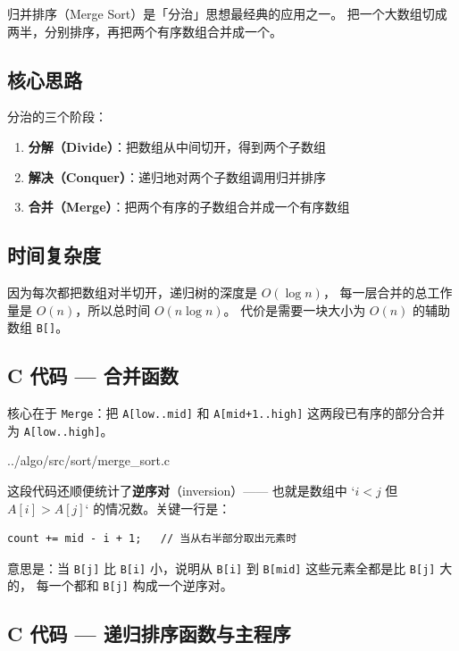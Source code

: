 归并排序（Merge Sort）是「分治」思想最经典的应用之一。
把一个大数组切成两半，分别排序，再把两个有序数组合并成一个。

\subsection{核心思路}

分治的三个阶段：

\begin{enumerate}
    \item \textbf{分解（Divide）}：把数组从中间切开，得到两个子数组
    \item \textbf{解决（Conquer）}：递归地对两个子数组调用归并排序
    \item \textbf{合并（Merge）}：把两个有序的子数组合并成一个有序数组
\end{enumerate}

\subsection{时间复杂度}

因为每次都把数组对半切开，递归树的深度是 \(O(\log n)\)，
每一层合并的总工作量是 \(O(n)\)，所以总时间 \(O(n \log n)\)。
代价是需要一块大小为 \(O(n)\) 的辅助数组 \texttt{B[]}。

\subsection{C 代码 — 合并函数}

核心在于 \texttt{Merge}：把 \texttt{A[low..mid]} 和 \texttt{A[mid+1..high]}
这两段已有序的部分合并为 \texttt{A[low..high]}。


{../algo/src/sort/merge_sort.c}

这段代码还顺便统计了\textbf{逆序对}（inversion）—— 也就是数组中
`\(i < j\) 但 \(A[i] > A[j]\)` 的情况数。关键一行是：

\begin{lstlisting}[style=cstyle]
count += mid - i + 1;   // 当从右半部分取出元素时
\end{lstlisting}

意思是：当 \texttt{B[j]} 比 \texttt{B[i]} 小，说明从 \texttt{B[i]}
到 \texttt{B[mid]} 这些元素全都是比 \texttt{B[j]} 大的，
每一个都和 \texttt{B[j]} 构成一个逆序对。

\subsection{C 代码 — 递归排序函数与主程序}

